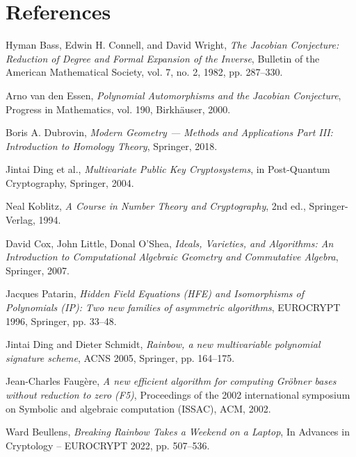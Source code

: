 \documentclass[12pt]{article}
\begin{document}
\section*{References}
\begin{thebibliography}{99}


Hyman Bass, Edwin H. Connell, and David Wright, 
\textit{The Jacobian Conjecture: Reduction of Degree and Formal Expansion of the Inverse}, 
Bulletin of the American Mathematical Society, vol. 7, no. 2, 1982, pp. 287–330.

Arno van den Essen, 
\textit{Polynomial Automorphisms and the Jacobian Conjecture}, 
Progress in Mathematics, vol. 190, Birkhäuser, 2000.

Boris A. Dubrovin, 
\textit{Modern Geometry — Methods and Applications Part III: Introduction to Homology Theory}, 
Springer, 2018.

Jintai Ding et al.,
\textit{Multivariate Public Key Cryptosystems}, 
in Post-Quantum Cryptography, Springer, 2004.

Neal Koblitz, 
\textit{A Course in Number Theory and Cryptography}, 
2nd ed., Springer-Verlag, 1994.

David Cox, John Little, Donal O'Shea,
\textit{Ideals, Varieties, and Algorithms: An Introduction to Computational Algebraic Geometry and Commutative Algebra}, 
Springer, 2007.

Jacques Patarin, 
\textit{Hidden Field Equations (HFE) and Isomorphisms of Polynomials (IP): Two new families of asymmetric algorithms}, 
EUROCRYPT 1996, Springer, pp. 33–48.

Jintai Ding and Dieter Schmidt, 
\textit{Rainbow, a new multivariable polynomial signature scheme}, 
ACNS 2005, Springer, pp. 164–175.

Jean-Charles Faugère, 
\textit{A new efficient algorithm for computing Gröbner bases without reduction to zero (F5)}, 
Proceedings of the 2002 international symposium on Symbolic and algebraic computation (ISSAC), ACM, 2002.

Ward Beullens,
\textit{Breaking Rainbow Takes a Weekend on a Laptop}, 
In Advances in Cryptology – EUROCRYPT 2022, pp. 507–536.


\end{thebibliography}
\end{document}
